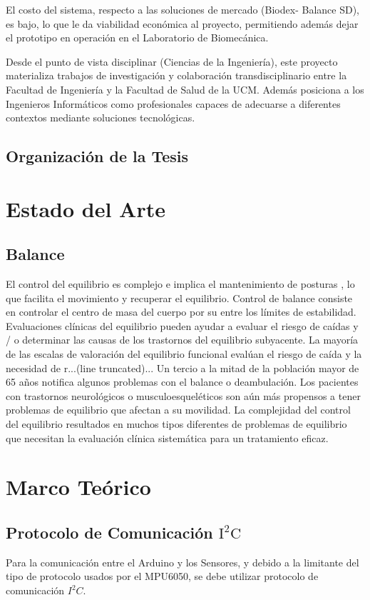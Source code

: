 \documentclass[12pt,a4paper]{article}
\begin{document}
			El costo del sistema, respecto a las soluciones de mercado (Biodex- Balance SD), es bajo, lo que le da viabilidad económica al proyecto, permitiendo además dejar el prototipo en operación en el Laboratorio de Biomecánica. 
			
			Desde el punto de vista disciplinar (Ciencias de la Ingeniería), este proyecto materializa trabajos de investigación y colaboración transdisciplinario entre la Facultad de Ingeniería y la Facultad de Salud de la UCM. Además posiciona a los Ingenieros Informáticos como profesionales capaces de adecuarse a diferentes contextos mediante soluciones tecnológicas.
			\subsection{Organizaci\'on de la Tesis}
			
			
			
			\section{Estado del Arte}
			\subsection{Balance}
			El control del equilibrio es complejo e implica el mantenimiento de posturas \cite{mancini}, lo que facilita el movimiento y recuperar el equilibrio. Control de balance consiste en controlar el centro de masa del cuerpo  por su entre los límites de estabilidad. Evaluaciones clínicas del equilibrio pueden ayudar a evaluar el riesgo de caídas y / o determinar las causas de los trastornos del equilibrio subyacente. La mayoría de las escalas de valoración del equilibrio funcional evalúan el riesgo de caída y la necesidad de r...(line truncated)...
			Un tercio a la mitad de la población mayor de 65 años notifica algunos problemas con el balance o
			deambulación. Los pacientes con trastornos neurológicos o musculoesqueléticos son aún más propensos a tener problemas de equilibrio que afectan a su movilidad. La complejidad del control del equilibrio resultados en muchos tipos diferentes de problemas de equilibrio que necesitan la evaluación clínica sistemática para un tratamiento eficaz.
			
			
			\section{Marco Te\'orico}
			
			\subsection{Protocolo de Comunicación $\mathbf{\mathrm{I^2C}}$}
			Para la comunicación entre el Arduino y los Sensores, y debido a la limitante del tipo de protocolo usados por el MPU6050, se debe utilizar protocolo de comunicación $I^2C$.
			
\end{document}
